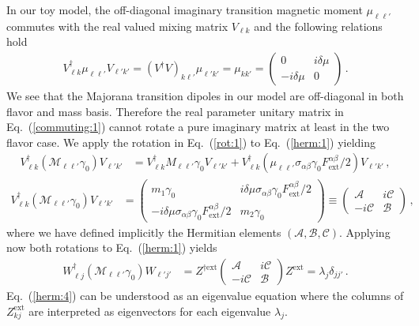 \documentclass[addchapnum]{ws-rv961x669} %
\newcommand{\req}[1]{Eq.~(\ref{#1})}
\begin{document}
In our toy model, the off-diagonal imaginary transition magnetic moment  $\mu_{\ell\ell'}$ commutes with the real valued mixing matrix $V_{\ell k}$ and the following relations hold
\begin{align}
\label{commuting:1}
V_{\ell k}^{\dag}\mu_{\ell\ell'}V_{\ell' k'}=(V^{\dag}V)_{k\ell'}\mu_{\ell'k'}=\mu_{kk'}=
\begin{pmatrix}
0 & i\delta\mu\\
-i\delta\mu & 0
\end{pmatrix}\,.
\end{align}
We see that the Majorana transition dipoles in our model are off-diagonal in both flavor and mass basis. Therefore the real parameter unitary matrix in \req{commuting:1} cannot rotate a pure imaginary matrix at least in the two flavor case. We apply the rotation in \req{rot:1} to \req{herm:1} yielding
\begin{align}
\label{herm:2}
V_{\ell k}^{\dag}(\mathcal{M}_{\ell\ell'}\gamma_{0})V_{\ell' k'} &= 
V_{\ell k}^{\dag}M_{\ell\ell'}\gamma_{0}V_{\ell' k'} +
V_{\ell k}^{\dag}(\mu_{\ell\ell'}\sigma_{\alpha\beta}\gamma_{0}F^{\alpha\beta}_\mathrm{ext}/2)V_{\ell' k'}\,,
\end{align}
%
\begin{align}
\label{herm:3}
V_{\ell k}^{\dag}(\mathcal{M}_{\ell\ell'}\gamma_{0})V_{\ell' k'} &= 
\begin{pmatrix}
m_{1}\gamma_{0} & i\delta\mu\sigma_{\alpha\beta}\gamma_{0}F^{\alpha\beta}_\mathrm{ext}/2\\
-i\delta\mu\sigma_{\alpha\beta}\gamma_{0}F^{\alpha\beta}_\mathrm{ext}/2 & m_{2}\gamma_{0}
\end{pmatrix}\equiv
\begin{pmatrix}
\mathcal{A} & i\mathcal{C}\\
-i\mathcal{C} & \mathcal{B}
\end{pmatrix}\,,
\end{align}
where we have defined implicitly the Hermitian elements $(\mathcal{A},\mathcal{B},\mathcal{C})$.  Applying now both rotations 
to \req{herm:1} yields
\begin{align}
\label{herm:4}
W_{\ell j}^{\dag}(\mathcal{M}_{\ell\ell'}\gamma_{0})W_{\ell' j'} &= 
Z^{\dag\mathrm{ext}}\begin{pmatrix}
\mathcal{A} & i\mathcal{C}\\
-i\mathcal{C} & \mathcal{B}
\end{pmatrix}Z^\mathrm{ext}=\lambda_{j}\delta_{jj'}\,.
\end{align}
\req{herm:4} can be understood as an eigenvalue equation where the columns of $Z_{kj}^\mathrm{ext}$ are interpreted as eigenvectors for each eigenvalue $\lambda_{j}$.
\end{document}
